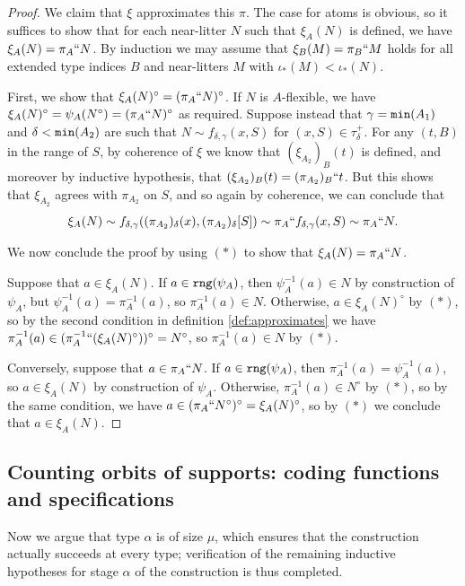 \documentclass{article}
\theoremstyle{definition}
\theoremstyle{remark}
\begin{document}
{\begin{proof}
  We claim that $\xi$ approximates this $\pi$.
  The case for atoms is obvious, so it suffices to show that for each near-litter $N$ such that $\xi_A(N)$ is defined, we have $\xi_A(N) = \pi_A `` N$.
  By induction we may assume that $\xi_B(M) = \pi_B `` M$ holds for all extended type indices $B$ and near-litters $M$ with $\iota_*(M) < \iota_*(N)$.

  First, we show that $\xi_A(N)^\circ = (\pi_A `` N)^\circ$.
  If $N$ is $A$-flexible, we have $\xi_A(N)^\circ = \psi_A(N^\circ) = (\pi_A `` N)^\circ$ as required.
  Suppose instead that $\gamma = {\tt min}(A_1)$ and $\delta < {\tt min}(A_2)$ are such that $N \sim f_{\delta,\gamma}(x, S)$ for $(x, S) \in \tau_\delta^+$.
  For any $(t, B)$ in the range of $S$, by coherence of $\xi$ we know that $(\xi_{A_2})_B(t)$ is defined, and moreover by inductive hypothesis, that $(\xi_{A_2})_B(t) = (\pi_{A_2})_B``t$.
  But this shows that $\xi_{A_2}$ agrees with $\pi_{A_2}$ on $S$, and so again by coherence, we can conclude that
  $$\xi_A(N) \sim f_{\delta,\gamma}((\pi_{A_2})_\delta(x), (\pi_{A_2})_\delta[S]) \sim \pi_A `` f_{\delta,\gamma}(x, S) \sim \pi_A `` N.$$

  We now conclude the proof by using $(*)$ to show that $\xi_A(N) = \pi_A `` N$.

  Suppose that $a \in \xi_A(N)$.
  If $a \in {\tt rng}(\psi_A)$, then $\psi_A^{-1}(a) \in N$ by construction of $\psi_A$, but $\psi_A^{-1}(a) = \pi_A^{-1}(a)$, so $\pi_A^{-1}(a) \in N$.
  Otherwise, $a \in \xi_A(N)^\circ$ by $(*)$, so by the second condition in definition \ref{def:approximates} we have $\pi_A^{-1}(a) \in (\pi_A^{-1}``(\xi_A(N)^\circ))^\circ = N^\circ$, so $\pi_A^{-1}(a) \in N$ by $(*)$.

  Conversely, suppose that $a \in \pi_A `` N$.
  If $a \in {\tt rng}(\psi_A)$, then $\pi_A^{-1}(a) = \psi_A^{-1}(a)$, so $a \in \xi_A(N)$ by construction of $\psi_A$.
  Otherwise, $\pi_A^{-1}(a) \in N^\circ$ by $(*)$, so by the same condition, we have $a \in (\pi_A``N^\circ)^\circ = \xi_A(N)^\circ$, so by $(*)$ we conclude that $a \in \xi_A(N)$.
\end{proof}

\newpage
\subsection{Counting orbits of supports:  coding functions and specifications}

Now we argue that type $\alpha$ is of size $\mu$, which ensures
that the construction actually succeeds at every type; verification of the remaining inductive hypotheses for stage $\alpha$ of the construction is thus completed.






}
\end{document}

